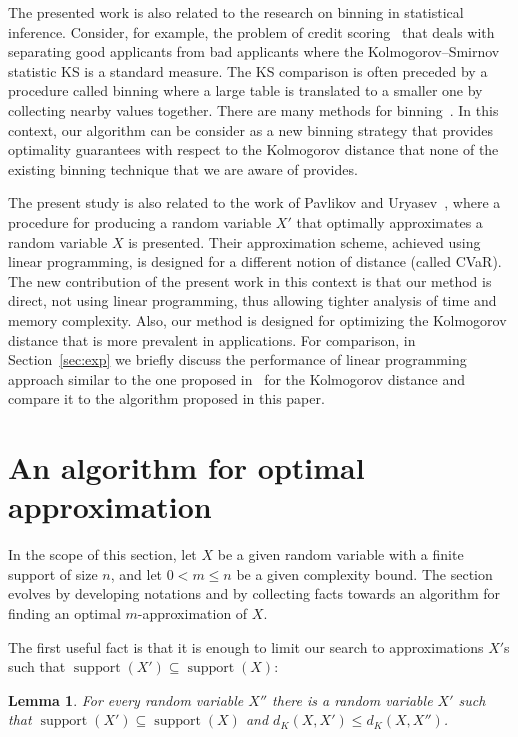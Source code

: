 \documentclass{article}
\newtheorem{lemma}[thm]{Lemma}
\DeclareMathOperator{\support}{support}
\begin{document}
	The presented work is also related to the research on binning in statistical inference. Consider, for example, the problem of credit scoring~\cite{zeng2017comparison} that deals with separating good applicants from bad applicants where the Kolmogorov–Smirnov statistic KS is a standard measure. The KS comparison is often preceded by a procedure called binning where a large table is translated to a smaller one by collecting nearby values together. There are many methods for binning~\cite{mays2001handbook,refaat2011credit,bolton2010logistic,siddiqi2012credit}.
	In this context, our algorithm can be consider as a new binning strategy that provides optimality guarantees with respect to the Kolmogorov distance that none of the existing binning technique that we are aware of provides.
	
	The present study is also related to the work of Pavlikov and Uryasev~\cite{pavlikov2016cvar}, where a procedure for producing a random variable $X'$ that optimally approximates a random variable $X$ is presented. Their approximation scheme, achieved using linear programming, is designed for a different notion of distance (called CVaR). The new contribution of the present work in this context is that our method is direct, not using linear programming, thus allowing tighter analysis of time and memory complexity. Also, our method is designed for optimizing the Kolmogorov distance that is more prevalent in applications. For comparison, in Section~\ref{sec:exp} we briefly discuss the performance of linear programming approach similar to the one proposed in~\cite{pavlikov2016cvar} for the Kolmogorov distance and compare it to the algorithm proposed in this paper. 
	
	\section{An algorithm for optimal approximation}\label{sec:alg}
	In the scope of this section, let $X$ be a given random variable with a finite support of size $n$, and let  $0<m\leq n$ be a given complexity bound. The section evolves by developing notations and by collecting facts towards an algorithm for finding an optimal $m$-approximation of $X$.
	
	The first useful fact is that it is enough to limit our search to approximations $X'$s such that $\support(X') \subseteq \support(X)$:
	
	\begin{lemma}\label{lem:supContained}
		For every random variable $X''$ there is a random variable $X'$ such that $\support(X') \subseteq \support(X)$ and $d_{K}(X,X')\leq d_{K}(X,X'')$.
	\end{lemma}
	
\end{document}
